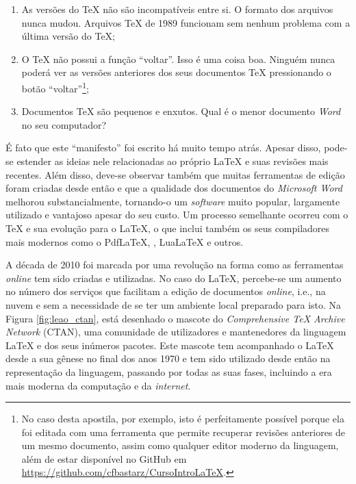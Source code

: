 \begin{enumerate}
    \item As versões do \TeX{} não são incompatíveis entre si. O formato dos arquivos nunca mudou. Arquivos \TeX{} de 1989 funcionam sem nenhum problema com a última versão do \TeX{};
    \item O \TeX{} não possui a função ``voltar''. Isso é uma coisa boa. Ninguém nunca poderá ver as versões anteriores dos seus documentos \TeX{} pressionando o botão ``voltar''\footnote{No caso desta apostila, por exemplo, isto é perfeitamente possível porque ela foi editada com uma ferramenta que permite recuperar revisões anteriores de um mesmo documento, assim como qualquer editor moderno da linguagem, além de estar disponível no GitHub em \url{https://github.com/cfbastarz/CursoIntroLaTeX}.};
    \item Documentos \TeX{} são pequenos e enxutos. Qual é o menor documento \textit{Word} no seu computador?
\end{enumerate}
\endgroup

É fato que este ``manifesto'' foi escrito há muito tempo atrás. Apesar disso, pode-se estender as ideias nele relacionadas ao próprio \LaTeX{} e suas revisões mais recentes. Além disso, deve-se observar também que muitas ferramentas de edição foram criadas desde então e que a qualidade dos documentos do \textit{Microsoft Word} melhorou substancialmente, tornando-o um \textit{software} muito popular, largamente utilizado e vantajoso apesar do seu custo. Um processo semelhante ocorreu com o \TeX{} e sua evolução para o \LaTeX{}, o que inclui também os seus compiladores mais modernos como o Pdf\LaTeX{}, \XeLaTeX{}, Lua\LaTeX{} e outros.

A década de 2010 foi marcada por uma revolução na forma como as ferramentas \textit{online} tem sido criadas e utilizadas. No caso do \LaTeX{}, percebe-se um aumento no número dos serviços que facilitam a edição de documentos \textit{online}, i.e., na nuvem e sem a necessidade de se ter um ambiente local preparado para isto. Na Figura \ref{fig:leao_ctan}, está desenhado o mascote do \textit{Comprehensive \TeX{} Archive Network} (CTAN), uma comunidade de utilizadores e mantenedores da linguagem \LaTeX{} e dos seus inúmeros pacotes. Este mascote tem acompanhado o \LaTeX{} desde a sua gênese no final dos anos 1970 e tem sido utilizado desde então na representação da linguagem, passando por todas as suas fases, incluindo a era mais moderna da computação e da \textit{internet}.

